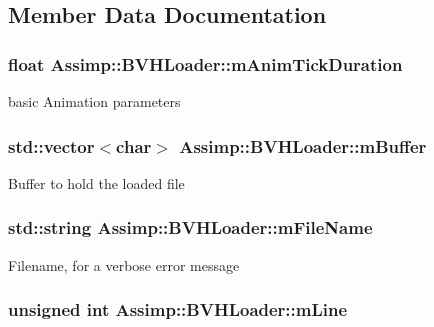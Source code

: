 \subsection{Member Data Documentation}
\hypertarget{class_assimp_1_1_b_v_h_loader_ad3515f43c7caa917c2b1b35d80da1565}{
\subsubsection[{m\+Anim\+Tick\+Duration}]{\setlength{\rightskip}{0pt plus 5cm}float Assimp\+::\+B\+V\+H\+Loader\+::m\+Anim\+Tick\+Duration\hspace{0.3cm}{\ttfamily [protected]}}}\label{class_assimp_1_1_b_v_h_loader_ad3515f43c7caa917c2b1b35d80da1565}
basic Animation parameters \hypertarget{class_assimp_1_1_b_v_h_loader_a63b77fea8384ccd978416a40eb2cf242}{
\subsubsection[{m\+Buffer}]{\setlength{\rightskip}{0pt plus 5cm}std\+::vector$<$char$>$ Assimp\+::\+B\+V\+H\+Loader\+::m\+Buffer\hspace{0.3cm}{\ttfamily [protected]}}}\label{class_assimp_1_1_b_v_h_loader_a63b77fea8384ccd978416a40eb2cf242}
Buffer to hold the loaded file \hypertarget{class_assimp_1_1_b_v_h_loader_a034214fb7761d7940b64caf8b569b4a3}{
\subsubsection[{m\+File\+Name}]{\setlength{\rightskip}{0pt plus 5cm}std\+::string Assimp\+::\+B\+V\+H\+Loader\+::m\+File\+Name\hspace{0.3cm}{\ttfamily [protected]}}}\label{class_assimp_1_1_b_v_h_loader_a034214fb7761d7940b64caf8b569b4a3}
Filename, for a verbose error message \hypertarget{class_assimp_1_1_b_v_h_loader_a3d51f5982c16a51785ec38ab4cd64dd3}{
\subsubsection[{m\+Line}]{\setlength{\rightskip}{0pt plus 5cm}unsigned int Assimp\+::\+B\+V\+H\+Loader\+::m\+Line\hspace{0.3cm}{\ttfamily [protected]}}}\label{class_assimp_1_1_b_v_h_loader_a3d51f5982c16a51785ec38ab4cd64dd3}
